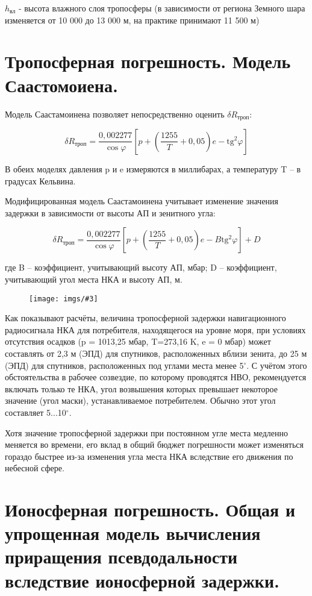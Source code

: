 \documentclass[14pt,a4paper,oneside]{extarticle}
\newcommand{\pic}[3]{
	\begin{figure}[#1]
		\begin{center}
			\texttt{[image: imgs/\#3]}
		\end{center}
	\end{figure}
}
\begin{document}
$h_\text{вл}$ - высота влажного слоя тропосферы (в зависимости от региона Земного шара изменяется от 10 000 до 13 000 м, на практике принимают 11 500 м)

\section{Тропосферная погрешность. Модель Саастомоиена.}

Модель Саастамоинена позволяет непосредственно оценить $\delta R_{\text{троп}}$:

\[\delta R_{\text{троп}}=\frac{0,002277}{\cos\varphi}\left[p+\left(\frac{1255}{T}+0,05\right)e-\mathrm{tg}^{2}\varphi\right]\]

В обеих моделях давления p и e измеряются в миллибарах, а температуру T – в градусах Кельвина.

Модифицированная модель Саастамоинена учитывает изменение значения задержки в зависимости от высоты АП и зенитного угла:

\[\delta R_{\text{троп}}=\frac{0,002277}{\cos\varphi}\left[p+\left(\frac{1255}{T}+0,05\right)e-B\mathrm{tg}^{2}\varphi\right]+D\]

где B – коэффициент, учитывающий высоту АП, мбар; D – коэффициент, учитывающий угол места НКА и высоту АП, м.

\pic{H}{\textwidth/2}{7_1}

Как показывают расчёты, величина тропосферной задержки навигационного радиосигнала НКА для потребителя, находящегося на уровне моря, при условиях отсутствия осадков (p = 1013,25 мбар, T=273,16 K, e = 0 мбар) может составлять от 2,3 м (ЭПД) для спутников, расположенных вблизи зенита, до 25 м (ЭПД) для спутников, расположенных под углами места менее 5$^\circ$. С учётом этого обстоятельства в рабочее созвездие, по которому проводятся НВО, рекомендуется включать только те НКА, угол возвышения которых превышает некоторое значение (угол маски), устанавливаемое потребителем. Обычно этот угол составляет 5...10$^\circ$.

Хотя значение тропосферной задержки при постоянном угле места медленно меняется во времени, его вклад в общий бюджет погрешности может изменяться гораздо быстрее из-за изменения угла места НКА вследствие его движения по небесной сфере.

\section{Ионосферная погрешность. Общая и упрощенная модель вычисления приращения псевдодальности вследствие ионосферной задержки.}
\end{document}
